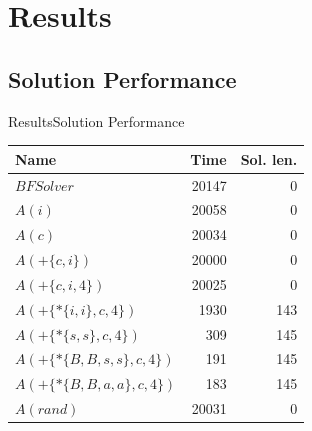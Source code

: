 \section{Results}
\subsection{Solution Performance}
\begin{frame}{Results}{Solution Performance}

  \begin{table}
    \centering
    \begin{tabular}{lrr}\toprule
      \textbf{ Name } & \textbf{  Time} &  \textbf{ Sol. len. }\\\midrule
      $BFSolver $&                 20147  &       0\\
      $A(i)$    &                 20058  &       0\\
      $A(c)$     &                20034  &       0\\
      $A(+\{c,i\})$ &               20000  &       0\\
      $A(+\{c,i,4\})$&              20025  &       0\\
      $A(+\{*\{i,i\},c,4\})$ &         1930  &     143\\
      $A(+\{*\{s,s\},c,4\})$  &         309  &     145\\
      $A(+\{*\{B,B,s,s\},c,4\})$&       191  &     145\\
      $A(+\{*\{B,B,a,a\},c,4\})$ &      183  &     145\\
      $A(rand)$               &   20031  &       0\\
      \bottomrule
    \end{tabular}
  \end{table}
  
\end{frame}


